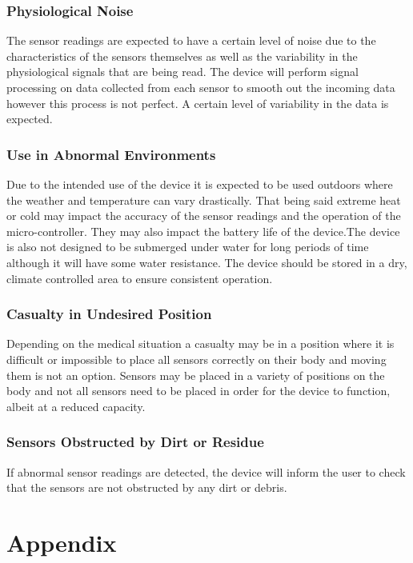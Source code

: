 \documentclass{article}
\begin{document}
	\subsubsection{Physiological Noise}
	The sensor readings are expected to have a certain level of noise due to the characteristics of the sensors themselves as well as the variability in the physiological signals that are being read. The device will perform signal processing on data collected from each sensor to smooth out the incoming data however this process is not perfect. A certain level of variability in the data is expected.
	
	\subsubsection{Use in Abnormal Environments}
	Due to the intended use of the device it is expected to be used outdoors where the weather and temperature can vary drastically. That being said extreme heat or cold may impact the accuracy of the sensor readings and the operation of the micro-controller. They may also impact the battery life of the device.The device is also not designed to be submerged under water for long periods of time although it will have some water resistance. The device should be stored in a dry, climate controlled area to ensure consistent operation. 
	
    \subsubsection{Casualty in Undesired Position}
    Depending on the medical situation a casualty may be in a position where it is difficult or impossible to place all sensors correctly on their body and moving them is not an option. Sensors may be placed in a variety of positions on the body and not all sensors need to be placed in order for the device to function, albeit at a reduced capacity. 
    
    \subsubsection{Sensors Obstructed by Dirt or Residue }
    If abnormal sensor readings are detected, the device will inform the user to check that the sensors are not obstructed by any dirt or debris.
    
    \newpage
	\section{Appendix}
	
    
    
    
    
\end{document}
